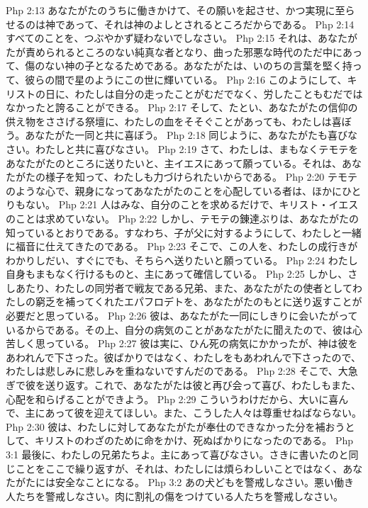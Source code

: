 Php 2:13  あなたがたのうちに働きかけて、その願いを起させ、かつ実現に至らせるのは神であって、それは神のよしとされるところだからである。
Php 2:14  すべてのことを、つぶやかず疑わないでしなさい。
Php 2:15  それは、あなたがたが責められるところのない純真な者となり、曲った邪悪な時代のただ中にあって、傷のない神の子となるためである。あなたがたは、いのちの言葉を堅く持って、彼らの間で星のようにこの世に輝いている。
Php 2:16  このようにして、キリストの日に、わたしは自分の走ったことがむだでなく、労したこともむだではなかったと誇ることができる。
Php 2:17  そして、たとい、あなたがたの信仰の供え物をささげる祭壇に、わたしの血をそそぐことがあっても、わたしは喜ぼう。あなたがた一同と共に喜ぼう。
Php 2:18  同じように、あなたがたも喜びなさい。わたしと共に喜びなさい。
Php 2:19  さて、わたしは、まもなくテモテをあなたがたのところに送りたいと、主イエスにあって願っている。それは、あなたがたの様子を知って、わたしも力づけられたいからである。
Php 2:20  テモテのような心で、親身になってあなたがたのことを心配している者は、ほかにひとりもない。
Php 2:21  人はみな、自分のことを求めるだけで、キリスト・イエスのことは求めていない。
Php 2:22  しかし、テモテの錬達ぶりは、あなたがたの知っているとおりである。すなわち、子が父に対するようにして、わたしと一緒に福音に仕えてきたのである。
Php 2:23  そこで、この人を、わたしの成行きがわかりしだい、すぐにでも、そちらへ送りたいと願っている。
Php 2:24  わたし自身もまもなく行けるものと、主にあって確信している。
Php 2:25  しかし、さしあたり、わたしの同労者で戦友である兄弟、また、あなたがたの使者としてわたしの窮乏を補ってくれたエパフロデトを、あなたがたのもとに送り返すことが必要だと思っている。
Php 2:26  彼は、あなたがた一同にしきりに会いたがっているからである。その上、自分の病気のことがあなたがたに聞えたので、彼は心苦しく思っている。
Php 2:27  彼は実に、ひん死の病気にかかったが、神は彼をあわれんで下さった。彼ばかりではなく、わたしをもあわれんで下さったので、わたしは悲しみに悲しみを重ねないですんだのである。
Php 2:28  そこで、大急ぎで彼を送り返す。これで、あなたがたは彼と再び会って喜び、わたしもまた、心配を和らげることができよう。
Php 2:29  こういうわけだから、大いに喜んで、主にあって彼を迎えてほしい。また、こうした人々は尊重せねばならない。
Php 2:30  彼は、わたしに対してあなたがたが奉仕のできなかった分を補おうとして、キリストのわざのために命をかけ、死ぬばかりになったのである。
Php 3:1  最後に、わたしの兄弟たちよ。主にあって喜びなさい。さきに書いたのと同じことをここで繰り返すが、それは、わたしには煩らわしいことではなく、あなたがたには安全なことになる。
Php 3:2  あの犬どもを警戒しなさい。悪い働き人たちを警戒しなさい。肉に割礼の傷をつけている人たちを警戒しなさい。
